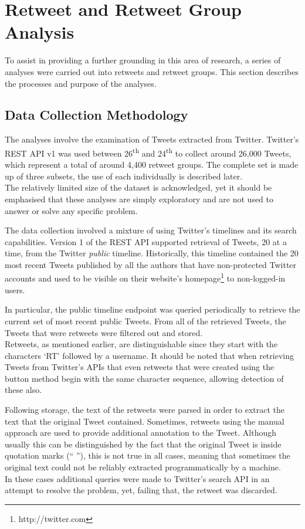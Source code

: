 \section{Retweet and Retweet Group Analysis}
To assist in providing a further grounding in this area of research, a series of analyses were carried out into retweets and retweet groups. This section describes the processes and purpose of the analyses.


\subsection{Data Collection Methodology}
The analyses involve the examination of Tweets extracted from Twitter. Twitter's REST API v1 was used between 26\textsuperscript{th} and 24\textsuperscript{th} to collect around 26,000 Tweets, which represent a total of around 4,400 retweet groups. The complete set is made up of three subsets, the use of each individually is described later.\\
The relatively limited size of the dataset is acknowledged, yet it should be emphasised that these analyses are simply exploratory and are not used to answer or solve any specific problem.

The data collection involved a mixture of using Twitter's timelines and its search capabilities. Version 1 of the REST API supported retrieval of Tweets, 20 at a time, from the Twitter \textit{public} timeline. Historically, this timeline contained the 20 most recent Tweets published by all the authors that have non-protected Twitter accounts and used to be visible on their website's homepage\footnote{http://twitter.com} to non-logged-in users.

In particular, the public timeline endpoint was queried periodically to retrieve the current set of most recent public Tweets. From all of the retrieved Tweets, the Tweets that were retweets were filtered out and stored.\\
Retweets, as mentioned earlier, are distinguishable since they start with the characters `RT' followed by a username. It should be noted that when retrieving Tweets from Twitter's APIs that even retweets that were created using the button method begin with the same character sequence, allowing detection of these also.

Following storage, the text of the retweets were parsed in order to extract the text that the original Tweet contained. Sometimes, retweets using the manual approach are used to provide additional annotation to the Tweet. Although usually this can be distinguished by the fact that the original Tweet is inside quotation marks (`` ''), this is not true in all cases, meaning that sometimes the original text could not be reliably extracted programmatically by a machine.\\
In these cases additional queries were made to Twitter's search API in an attempt to resolve the problem, yet, failing that, the retweet was discarded.

